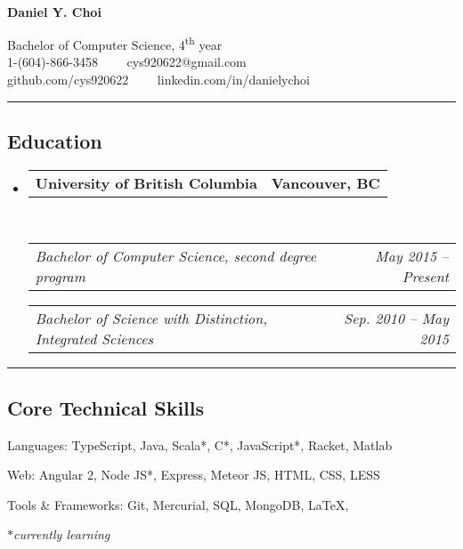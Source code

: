 \documentclass[10pt,letterpaper]{article}
\makeatletter
\newenvironment{indentsection}[1]%
{\begin{list}{}%
	{\setlength{\leftmargin}{#1}}%
	\item[]%
}
{\end{list}}
\newcommand{\headerrow}[2]
{\begin{tabular*}{\linewidth}{l@{\extracolsep{\fill}}r}
	#1 &
	#2 \\
\end{tabular*}}
\newcommand{\CPP}
{C\nolinebreak[4]\hspace{-.05em}\raisebox{.22ex}{\footnotesize\bf ++}}
\makeatother
\begin{document}

\begin{center}
\thispagestyle{firststyle}
{\LARGE \textbf{\\Daniel Y. Choi}}

Bachelor of Computer Science, 4\textsuperscript{th} year
\\
1-(604)-866-3458\ \ \textbullet
\ \ cys920622@gmail.com
\\
github.com/cys920622\ \ \textbullet
\ \ linkedin.com/in/danielychoi
\end{center}

\hrule
\vspace{-0.4em}

\subsection*{Education}

\begin{itemize}
	\parskip=0.1em

	\item 
	\headerrow
		{\textbf{University of British Columbia}}
		{\textbf{Vancouver, BC}}
	\\
	\headerrow
		{\emph{Bachelor of Computer Science, second degree program}}
		{\emph{May 2015 -- Present}}
	
	\headerrow
		{\emph{Bachelor of Science with Distinction, Integrated Sciences}}
		{\emph{Sep. 2010 -- May 2015}}
\end{itemize}


\hrule
\vspace{-0.4em}

\subsection*{Core Technical Skills}

\begin{indentsection}{\parindent}
\begin{description*}
	\item[Languages:]
	TypeScript, Java, Scala*, \CPP*, JavaScript*, Racket, Matlab
	\item[Web:]
	Angular 2, Node JS*, Express, Meteor JS, HTML, CSS, LESS
	\item[Tools \& Frameworks:]
	Git, Mercurial, SQL, MongoDB, \LaTeX, 
\end{description*}
\hfill{\emph{$\ast$currently learning}}
\end{indentsection}
\end{document}
